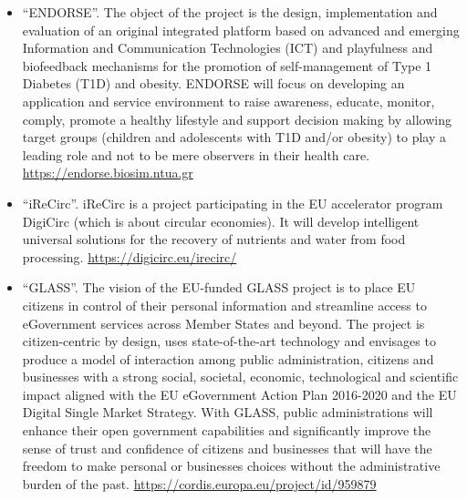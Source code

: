 \documentclass[a4paper,oneside,10pt]{article}
\begin{document}
\begin{itemize}
\item \begin{sloppypar}
``ENDORSE''. The object of the project is the design, implementation and evaluation of an original integrated platform based on advanced and emerging Information and Communication Technologies (ICT) and playfulness and biofeedback mechanisms for the promotion of self-management of Type 1 Diabetes (T1D) and obesity. ENDORSE will focus on developing an application and service environment to raise awareness, educate, monitor, comply, promote a healthy lifestyle and support decision making by allowing target groups (children and adolescents with T1D and/or obesity) to play a leading role and not to be mere observers in their health care. \url{https://endorse.biosim.ntua.gr}

\end{sloppypar}

\item \begin{sloppypar}
``iReCirc''. iReCirc is a project participating in the EU accelerator program DigiCirc (which is about circular economies). It will develop intelligent universal solutions for the recovery of nutrients and water from food processing. \url{https://digicirc.eu/irecirc/}

\end{sloppypar}

\item \begin{sloppypar}
``GLASS''. The vision of the EU-funded GLASS project is to place EU citizens in control of their personal information and streamline access to eGovernment services across Member States and beyond. The project is citizen-centric by design, uses state-of-the-art technology and envisages to produce a model of interaction among public administration, citizens and businesses with a strong social, societal, economic, technological and scientific impact aligned with the EU eGovernment Action Plan 2016-2020 and the EU Digital Single Market Strategy. With GLASS, public administrations will enhance their open government capabilities and significantly improve the sense of trust and confidence of citizens and businesses that will have the freedom to make personal or businesses choices without the administrative burden of the past. \url{https://cordis.europa.eu/project/id/959879}

\end{sloppypar}


\end{itemize}
\end{document}

